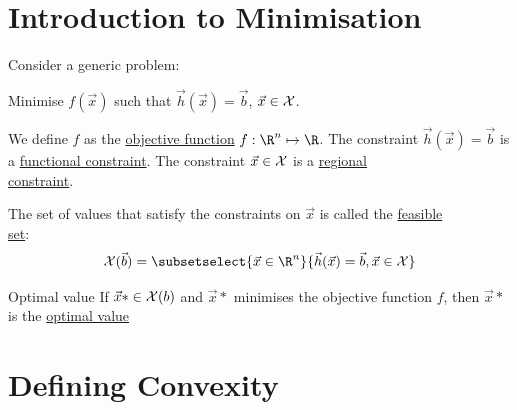 \documentclass[../Main.tex]{subfiles}
\begin{document}
\section{Introduction to Minimisation}
Consider a generic problem:

Minimise $f(\vec{x})$ such that $\vec{h}(\vec{x}) = \vec{b}$, $\vec{x} \in \mathcal{X}$.

We define $f$ as the \underline{objective function} $f : \R^n \mapsto \R$. The constraint $\vec{h}(\vec{x}) = \vec{b}$ is a \underline{functional constraint}. The constraint $\vec{x} \in \mathcal{X}$ is a \underline{regional}\\\underline{constraint}.

The set of values that satisfy the constraints on $\vec{x}$ is called the \underline{feasible}\\\underline{set}:
\begin{equation}
    \Xset(\vec{b}) = \subsetselect{\vec{x} \in \R^n}{\vec{h}(\vec{x}) = \vec{b}, \vec{x} \in \Xset}
    \label{eqnFeasibleSet}
\end{equation}
\begin{definition}{Optimal value}
    If $\vec{x}* \in \mathcal{X}(b)$ and $\vec{x}*$ minimises the objective function $f$, then $\vec{x}*$ is the \underline{optimal value}
\end{definition}
\section{Defining Convexity}
\end{document}
